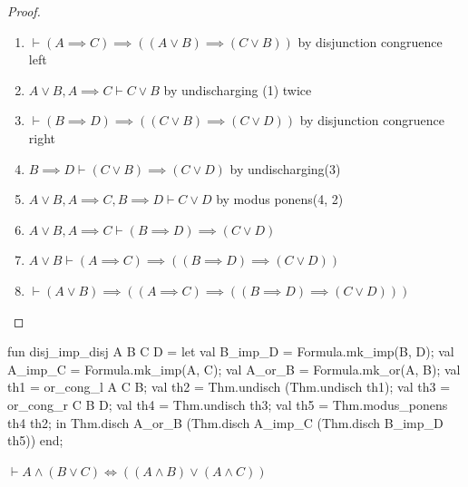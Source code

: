 \begin{proof}
\begin{enumerate}
\item $\vdash(A\implies C)\implies((A\lor B)\implies(C\lor B))$ by
  disjunction congruence left%
\item $A\lor B,A\implies C\vdash C\lor B$ by undischarging (1) twice%
\item $\vdash(B\implies D)\implies((C\lor B)\implies(C\lor D))$ by
  disjunction congruence right%
\item $B\implies D\vdash(C\lor B)\implies(C\lor D)$ by undischarging(3)%
\item $A\lor B,A\implies C,B\implies D\vdash C\lor D$ by modus
  ponens(4, 2)
\item $A\lor B,A\implies C\vdash(B\implies D)\implies(C\lor D)$
\item $A\lor B\vdash(A\implies C)\implies((B\implies D)\implies(C\lor D))$
\item $\vdash(A\lor B)\implies((A\implies C)\implies((B\implies D)\implies(C\lor D)))$\qedhere
\end{enumerate}
\end{proof}

\nwenddocs{}\endmoddef\nwstartdeflinemarkup{}\nwenddeflinemarkup
fun disj_imp_disj A B C D =
  let
    val B_imp_D = Formula.mk_imp(B, D);
    val A_imp_C = Formula.mk_imp(A, C);
    val A_or_B = Formula.mk_or(A, B);
    val th1 = or_cong_l A C B;
    val th2 = Thm.undisch (Thm.undisch th1);
    val th3 = or_cong_r C B D;
    val th4 = Thm.undisch th3;
    val th5 = Thm.modus_ponens th4 th2;
  in
    Thm.disch A_or_B (Thm.disch A_imp_C (Thm.disch B_imp_D th5))
  end;
\eatline
{}\nwendcode{}\nwdocspar
\begin{node}%
$\vdash A\land(B\lor C)\iff((A\land B)\lor(A\land C))$
\end{node}

